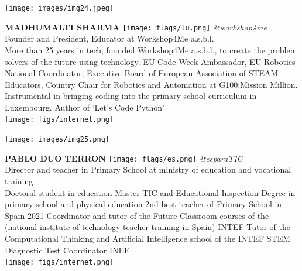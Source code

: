 \documentclass[11pt]{article}
\begin{document}
\noindent
\begin{minipage}{0.3\textwidth}
\centering
\texttt{[image: images/img24.jpeg]}
\end{minipage}
\hfill
\begin{minipage}{0.6\textwidth}\raggedright
\color{color1}\uppercase{\textbf{Madhumalti Sharma}}
\color{color2}\hspace{0.2cm}\texttt{[image: flags/lu.png]}
\hspace{0.2cm}\textit{@workshop4me}
\\
Founder and President, Educator at Workshop4Me a.s.b.l.\\
{\footnotesize More than 25 years in tech, founded Workshop4Me a.s.b.l., to create the problem solvers of the future using technology. EU Code Week Ambassador, EU Robotics National Coordinator, Executive Board of European Association of STEAM Educators, Country Chair for Robotics and Automation at G100:Mission Million. Instrumental in bringing coding into the primary school curriculum in Luxembourg. Author of ‘Let’s Code Python’}\\
\texttt{[image: figs/internet.png]}
\end{minipage}
\newline\newline\newline

\noindent
\begin{minipage}{0.3\textwidth}
\centering
\texttt{[image: images/img25.png]}
\end{minipage}
\hfill
\begin{minipage}{0.6\textwidth}\raggedright
\color{color1}\uppercase{\textbf{Pablo Duo Terron}}
\color{color2}\hspace{0.2cm}\texttt{[image: flags/es.png]}
\hspace{0.2cm}\textit{@esparaTIC}
\\
Director and teacher  in Primary School at ministry of education and vocational training\\
{\footnotesize Doctoral student in education 
Master TIC and Educational Inspection 
Degree in primary school and physical education  
2nd best teacher of Primary School in Spain 2021
Coordinator and tutor of the Future Classroom courses of the (national institute of technology teacher training in Spain) INTEF
Tutor of the Computational Thinking and Artificial Intelligence school of the INTEF
STEM Diagnostic Test Coordinator INEE}\\
\texttt{[image: figs/internet.png]}
\end{minipage}
\newline\newline\newline
\end{document}
